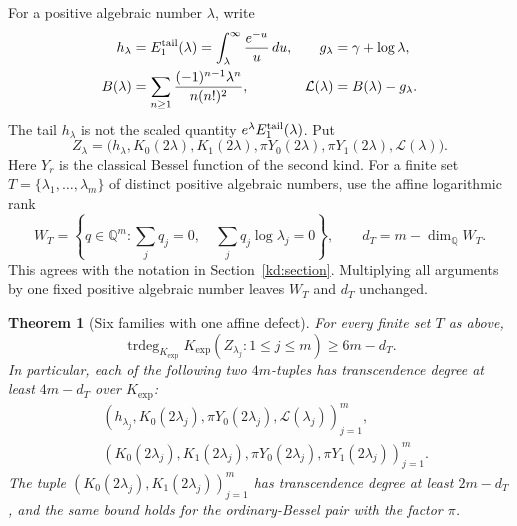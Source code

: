 \documentclass[11pt]{article}
\newtheorem{theorem}{Theorem}[section]
\theoremstyle{definition}
\theoremstyle{remark}
\newcommand{\trdeg}{\operatorname{trdeg}}
\newcommand{\Kexp}{K_{\mathrm{exp}}}
\begin{document}
For a positive algebraic number $\lambda$, write
\begin{align}
 h_\lambda&=E_1^{\rm tail}(\lambda)
       =\int_\lambda^\infty\frac{e^{-u}}u\,du,
 &g_\lambda&=\gamma+\log\lambda,\label{jden:tail}\\
 B(\lambda)&=\sum_{n\ge1}\frac{(-1)^{n-1}\lambda^n}{n(n!)^2},
 &\mathcal L(\lambda)&=B(\lambda)-g_\lambda.\label{jden:limit}
\end{align}
The tail $h_\lambda$ is not the scaled quantity
$e^\lambda E_1^{\rm tail}(\lambda)$. Put
\begin{equation}\label{jden:coordinates}
 Z_\lambda=
 \bigl(h_\lambda,K_0(2\lambda),K_1(2\lambda),
             \pi Y_0(2\lambda),\pi Y_1(2\lambda),
             \mathcal L(\lambda)\bigr).
\end{equation}
Here $Y_r$ is the classical Bessel function of the second kind. For a
finite set $T=\{\lambda_1,\ldots,\lambda_m\}$ of distinct positive
algebraic numbers, use the affine logarithmic rank
\begin{equation}\label{jden:affine}
 W_T=\left\{q\in\mathbb Q^m:
       \sum_jq_j=0,\quad\sum_jq_j\log\lambda_j=0\right\},
 \qquad d_T=m-\dim_{\mathbb Q}W_T.
\end{equation}
This agrees with the notation in Section~\ref{kd:section}. Multiplying
all arguments by one fixed positive algebraic number leaves $W_T$ and
$d_T$ unchanged.

\begin{theorem}[Six families with one affine defect]\label{jden:rank}
For every finite set $T$ as above,
\begin{equation}\label{jden:sixrank}
 \trdeg_{\Kexp}\Kexp(Z_{\lambda_j}:1\le j\le m)
 \ge 6m-d_T.
\end{equation}
In particular, each of the following two $4m$-tuples has transcendence
degree at least $4m-d_T$ over $\Kexp$:
\begin{align}
 &(h_{\lambda_j},K_0(2\lambda_j),\pi Y_0(2\lambda_j),
                          \mathcal L(\lambda_j))_{j=1}^m,
                          \label{jden:fourrank}\\
 &(K_0(2\lambda_j),K_1(2\lambda_j),
                  \pi Y_0(2\lambda_j),\pi Y_1(2\lambda_j))_{j=1}^m.
                          \label{jden:pairedrank}
\end{align}
The tuple $(K_0(2\lambda_j),K_1(2\lambda_j))_{j=1}^m$ has
transcendence degree at least $2m-d_T$, and the same bound holds for
the ordinary-Bessel pair with the factor $\pi$.
\end{theorem}
\end{document}
